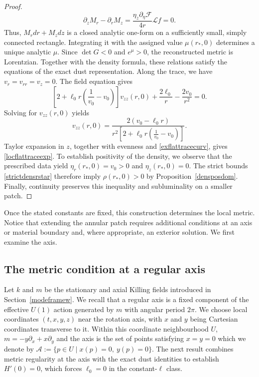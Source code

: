 \documentclass[amsmath,amsfonts,amssymb,aps,pra,superscriptaddress,10pt]{revtex4-2}
\numberwithin{equation}{section}
\theoremstyle{plain}
\theoremstyle{definition}
\theoremstyle{remark}
\theoremstyle{definition}
\newcommand{\ellzero}{\ell_0}
\begin{document}
\begin{proof}
\begin{equation}
\partial_z M_r-\partial_r M_z=\frac{\eta_z\partial_\eta\mathcal{F}}{4r}\mathcal{L} f=0.
\end{equation}
Thus, $M_r dr+M_z dz$ is a closed analytic one-form on a sufficiently small, simply connected rectangle. Integrating it with the assigned value $\mu(r_*,0)$ determines a unique analytic $\mu$. Since $\det G<0$ and $e^\mu>0$, the reconstructed metric is Lorentzian. Together with the density formula, these relations satisfy the equations of the exact dust representation. Along the trace, we have $v_r=v_{rr}=v_z=0$. The field equation gives
\begin{equation}\label{exflattracebal}
\left[2+\ellzero r\left(\frac{1}{v_{0}}-v_{0}\right)\right]v_{zz}(r,0)
+\frac{2\ellzero}{r}-\frac{2v_{0}}{r^{2}}=0.
\end{equation}
Solving for $v_{zz}(r,0)$ yields
\begin{equation}\label{exflattracecurv}
v_{zz}(r,0)=\frac{2(v_{0}-\ellzero r)}{r^{2}\left[2+\ellzero r\left(\frac{1}{v_{0}}-v_{0}\right)\right]}.
\end{equation}
Taylor expansion in $z$, together with evenness and \eqref{exflattracecurv}, gives \eqref{locflattraceexp}. To establish positivity of the density, we observe that the prescribed data yield
$\eta_r(r_{*},0)=v_{0}>0$ and $\eta_z(r_{*},0)=0$. The strict bounds \eqref{strictdensrstar} therefore imply $\rho(r_{*},0)>0$ by Proposition~\ref{densposdom}. Finally, continuity preserves this inequality and subluminality on a smaller patch.
\end{proof}

Once the stated constants are fixed, this construction determines the local metric. Notice that extending the annular patch requires additional conditions at an axis or material boundary and, where appropriate, an exterior solution. We first examine the axis.

\subsection{The metric condition at a regular axis}

Let $k$ and $m$ be the stationary and axial Killing fields introduced in Section~\ref{modeframew}. We recall that a regular axis is a fixed component of the effective $U(1)$ action generated by $m$ with angular period $2\pi$. We choose local coordinates $(t,x,y,z)$ near the rotation axis, with $x$ and $y$ being Cartesian coordinates transverse to it. Within this coordinate neighbourhood $U$, $m=-y\partial_x+x\partial_y$ and the axis is the set of points satisfying $x=y=0$ which we denote by $\mathcal{A}:=\{p\in U\mid x(p)=0,~y(p)=0\}$. The next result combines metric regularity at the axis with the exact dust identities to establish $H'(0)=0$, which forces $\ellzero=0$ in the constant-$\ell$ class.
\end{document}

